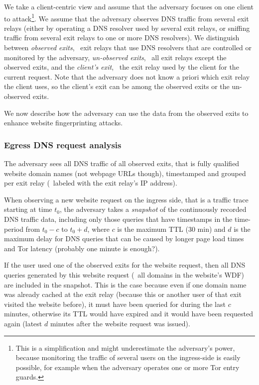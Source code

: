 We take a client-centric view and assume that the adversary focuses on
one client to attack\footnote{This is a simplification and might underestimate
the adversary's power, because monitoring the traffic of several users
on the ingress-side is easily possible, for example when the adversary
operates one or more Tor entry guards.}.
%
We assume that the adversary observes DNS traffic from several exit
relays (either by operating a DNS resolver used by several exit relays,
or sniffing traffic from several exit relays to one or more DNS
resolvers).
%
We distinguish between \emph{observed exits}, \ie~exit relays that use
DNS resolvers that are controlled or monitored by the adversary,
\emph{un-observed exits}, \ie~all exit relays except the observed
exits, and the \emph{client's exit}, \ie~the exit relay used by the
client for the current request.
%
Note that the adversary does not know a priori which exit relay the
client uses, so the client's exit can be among the observed exits or the
un-observed exits.

%
We now describe how the adversary can use the data from the observed
exits to enhance website fingerprinting attacks.


\subsubsection{Egress DNS request analysis}

The adversary sees all DNS traffic of all observed exits, that is fully
qualified website domain names (not webpage URLs though), timestamped
and grouped per exit relay (\eg~labeled with the exit relay's IP
address).

When observing a new website request on the ingress side, that is a
traffic trace starting at time $t_0$, the adversary takes a \emph{snapshot}
of the continuously recorded DNS traffic data, including only those queries
that have timestamps in the time-period from $t_0 - c$ to $t_0 + d$,
where $c$ is the maximum TTL (30 min) and $d$ is the maximum delay
for DNS queries that can be caused by longer page load times and Tor
latency (probably one minute is enough?).

If the user used one of the observed exits for the website request, then
all DNS queries generated by this website request (\ie~all domains in
the website's WDF) are included in the snapshot. This is the case
because even if one domain name was already cached at the exit relay
(because this or another user of that exit visited the website before),
it must have been queried for during the last $c$ minutes, otherwise its
TTL would have expired and it would have been requested again (latest
$d$ minutes after the website request was issued).

